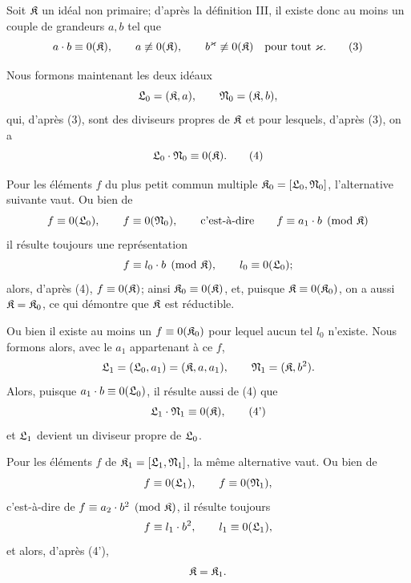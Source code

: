 Soit $\mathfrak{K}$ un idéal non primaire; d'après la définition III, il existe donc au moins un couple de grandeurs $a,b$ tel que
\begin{equation}
 a\cdot b\equiv0(\mathfrak{K}),\qquad
 a\not\equiv0(\mathfrak{K}),\qquad
 b^\varkappa\not\equiv0(\mathfrak{K})\quad \text{pour tout }\varkappa.
\tag{3}
\end{equation}

Nous formons maintenant les deux idéaux
\[
 \mathfrak{L}_0=(\mathfrak{K},a),\qquad \mathfrak{N}_0=(\mathfrak{K},b),
\]
qui, d'après (3), sont des diviseurs propres de $\mathfrak{K}$ et pour lesquels, d'après (3), on a
\begin{equation}
 \mathfrak{L}_0\cdot\mathfrak{N}_0\equiv0(\mathfrak{K}).
\tag{4}
\end{equation}

Pour les éléments $f$ du plus petit commun multiple $\mathfrak{K}_0=[\mathfrak{L}_0,\mathfrak{N}_0]$, l'alternative suivante vaut. Ou bien de
\[
 f\equiv0(\mathfrak{L}_0),\qquad f\equiv0(\mathfrak{N}_0),\qquad \text{c'est-à-dire}\qquad f\equiv a_1\cdot b\pmod{\mathfrak{K}}
\]
il résulte toujours une représentation
\[
 f\equiv l_0\cdot b\pmod{\mathfrak{K}},\qquad l_0\equiv0(\mathfrak{L}_0);
\]
alors, d'après (4), $f\equiv0(\mathfrak{K})$; ainsi $\mathfrak{K}_0\equiv0(\mathfrak{K})$, et, puisque $\mathfrak{K}\equiv0(\mathfrak{K}_0)$, on a aussi $\mathfrak{K}=\mathfrak{K}_0$, ce qui démontre que $\mathfrak{K}$ est réductible.

Ou bien il existe au moins un $f\equiv0(\mathfrak{K}_0)$ pour lequel aucun tel $l_0$ n'existe. Nous formons alors, avec le $a_1$ appartenant à ce $f$,
\[
 \mathfrak{L}_1=(\mathfrak{L}_0,a_1)=(\mathfrak{K},a,a_1),\qquad
 \mathfrak{N}_1=(\mathfrak{K},b^2).
\]
Alors, puisque $a_1\cdot b\equiv0(\mathfrak{L}_0)$, il résulte aussi de (4) que
\begin{equation}
 \mathfrak{L}_1\cdot\mathfrak{N}_1\equiv0(\mathfrak{K}),
\tag{4'}
\end{equation}
et $\mathfrak{L}_1$ devient un diviseur propre de $\mathfrak{L}_0$.

Pour les éléments $f$ de $\mathfrak{K}_1=[\mathfrak{L}_1,\mathfrak{N}_1]$, la même alternative vaut. Ou bien de
\[
 f\equiv0(\mathfrak{L}_1),\qquad f\equiv0(\mathfrak{N}_1),
\]
c'est-à-dire de $f\equiv a_2\cdot b^2\pmod{\mathfrak{K}}$, il résulte toujours
\[
 f\equiv l_1\cdot b^2,
 \qquad l_1\equiv0(\mathfrak{L}_1),
\]
et alors, d'après (4'),
\[
 \mathfrak{K}=\mathfrak{K}_1.
\]

